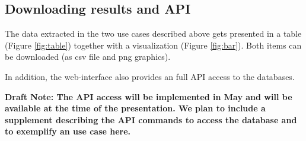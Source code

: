 \subsection{Downloading results and API}

The data extracted in the two use cases described above gets presented in a table (Figure \ref{fig:table}) together with a visualization (Figure \ref{fig:bar}). Both items can be downloaded (as csv file and png graphics).

In addition, the web-interface also provides an full API access to the databases. 

\textbf{Draft Note: The API access will be implemented in May and will be available at the time of the presentation. We plan to include a supplement describing the API commands to access the database and to exemplify  an use case here.}

